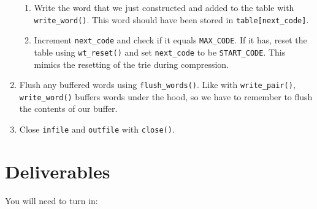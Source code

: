 \documentclass{article}
\begin{document}
\begin{enumerate}
\begin{enumerate}
            \item Write the word that we just constructed and added to the
                table with \texttt{write\_word()}. This word should have been
                stored in \texttt{table[next\_code]}.

            \item Increment \texttt{next\_code} and check if it equals
                \texttt{MAX\_CODE}. If it has, reset the table using
                \texttt{wt\_reset()} and set \texttt{next\_code} to be
                \texttt{START\_CODE}. This mimics the resetting of the trie
                during compression.
        \end{enumerate}

    \item Flush any buffered words using \texttt{flush\_words()}. Like
      with \texttt{write\_pair()}, \texttt{write\_word()} buffers words
      under the hood, so we have to remember to flush the contents of
      our buffer.

    \item Close \texttt{infile} and \texttt{outfile} with \texttt{close()}.
\end{enumerate}

\section{Deliverables}
You will need to turn in:
\end{document}
